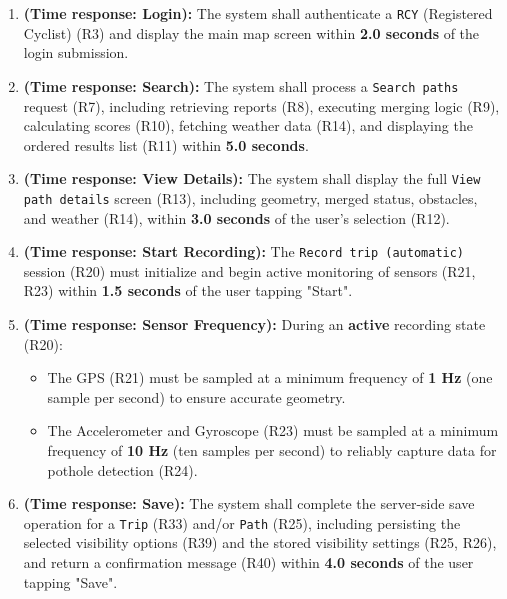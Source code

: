 \begin{enumerate}[label=\textbf{PR-\arabic*.}, leftmargin=*, itemsep=2pt]

    \item \textbf{(Time response: Login):} The system shall authenticate a \texttt{RCY} (Registered Cyclist) (R3) and display the main map screen within \textbf{2.0 seconds} of the login submission.
    
    \item \textbf{(Time response: Search):} The system shall process a \texttt{Search paths} request (R7), including retrieving reports (R8), executing merging logic (R9), calculating scores (R10), fetching weather data (R14), and displaying the ordered results list (R11) within \textbf{5.0 seconds}.
    
    \item \textbf{(Time response: View Details):} The system shall display the full \texttt{View path details} screen (R13), including geometry, merged status, obstacles, and weather (R14), within \textbf{3.0 seconds} of the user's selection (R12).
    
    \item \textbf{(Time response: Start Recording):} The \texttt{Record trip (automatic)} session (R20) must initialize and begin active monitoring of sensors (R21, R23) within \textbf{1.5 seconds} of the user tapping "Start".
    
    \item \textbf{(Time response: Sensor Frequency):} During an \textbf{active} recording state (R20):
    \begin{itemize}[leftmargin=*, noitemsep, nolistsep]
        \item The GPS (R21) must be sampled at a minimum frequency of \textbf{1 Hz} (one sample per second) to ensure accurate geometry.
        \item The Accelerometer and Gyroscope (R23) must be sampled at a minimum frequency of \textbf{10 Hz} (ten samples per second) to reliably capture data for pothole detection (R24).
    \end{itemize}
    
    \item \textbf{(Time response: Save):} The system shall complete the server-side save operation for a \texttt{Trip} (R33) and/or \texttt{Path} (R25), including persisting the selected visibility options (R39) and the stored visibility settings (R25, R26), and return a confirmation message (R40) within \textbf{4.0 seconds} of the user tapping "Save".
    

\end{enumerate}
